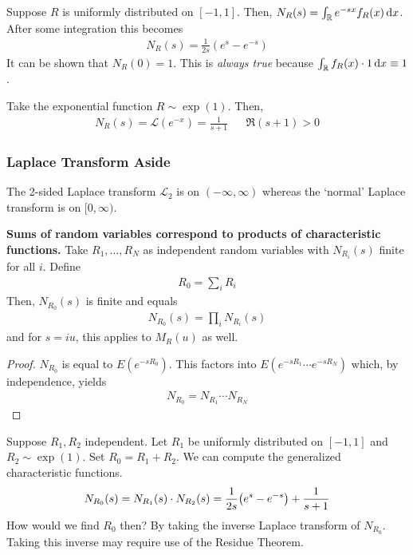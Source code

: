 \begin{lemma}
    Suppose $R$ is uniformly distributed on $[-1,1]$. Then, $N_R(s) = \int_{\mathbb{R}} e^{-sx} f_R(x) \dd{x}$. After some integration this becomes
    \begin{align}
        N_R(s) = \frac{1}{2s}(e^s - e^{-s})
    \end{align}
    It can be shown that $N_R(0) = 1$. This is \textit{always true} because $\int_{\mathbb{R}} f_R(x) \cdot 1 \dd{x} \equiv 1$.
\end{lemma}

\begin{example}
    Take the exponential function $R \sim \exp(1)$. Then,
    \begin{align}
        N_R(s) = \mathcal{L}(e^{-x}) = \frac{1}{s+1} && \Re(s+1) > 0
    \end{align}
\end{example}

\subsubsection{Laplace Transform Aside}
\begin{aside}
    The 2-sided Laplace transform $\mathcal{L}_2$ is on $(-\infty,\infty)$ whereas the `normal' Laplace transform is on $[0,\infty)$.
\end{aside}
\begin{theorem}
    \textbf{Sums of random variables correspond to products of characteristic functions.} Take $R_1, \ldots, R_N$ as independent random variables with $N_{R_i}(s)$ finite for all $i$. Define
    \begin{align}
       R_0 = \sum_i R_i
    \end{align}
    Then, $N_{R_0}(s)$ is finite and equals
    \begin{align}
        N_{R_0}(s) = \prod_i N_{R_i}(s)
    \end{align}
    and for $s = iu$, this applies to $M_R(u)$ as well.
\end{theorem}
\begin{proof}
    $N_{R_0}$ is equal to $E(e^{-sR_0})$. This factors into $E(e^{-sR_1} \cdots e^{-sR_N})$ which, by independence, yields
    \begin{align}
        N_{R_0} = N_{R_1} \cdots N_{R_N}
    \end{align}
\end{proof}

\begin{example}
    Suppose $R_1,R_2$ independent. Let $R_1$ be uniformly distributed on $[-1,1]$ and $R_2 \sim \exp(1)$. Set $R_0 = R_1 + R_2$. We can compute the generalized characteristic functions.
    \begin{align}
        N_{R_0}(s) = N_{R_1}(s)\cdot N_{R_2}(s) = \frac{1}{2s}\qty(e^s - e^{-s}) + \frac{1}{s+1}
    \end{align}
    How would we find $R_0$ then? By taking the inverse Laplace transform of $N_{R_0}$. Taking this inverse may require use of the Residue Theorem.
\end{example}

